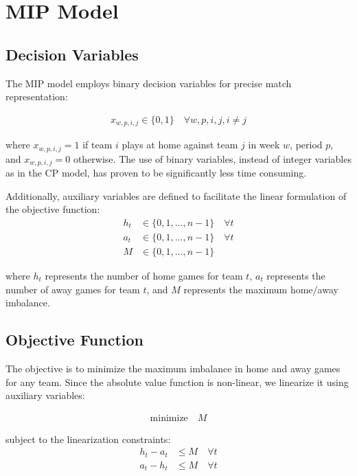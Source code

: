 \documentclass[11pt]{article}
\begin{document}
\section{MIP Model}

\subsection{Decision Variables}

The MIP model employs binary decision variables for precise match representation:

\begin{align}
x_{w,p,i,j} \in \{0,1\} \quad \forall w, p, i,j, i \neq j
\end{align}

where $x_{w,p,i,j} = 1$ if team $i$ plays at home against team $j$ in week $w$, period $p$, and $x_{w,p,i,j} = 0$ otherwise. The use of binary variables, instead of integer variables as in the CP model, has proven to be significantly less time consuming.

Additionally, auxiliary variables are defined to facilitate the linear formulation of the objective function:
\begin{align}
h_t &\in \{0, 1, \ldots, n-1\} \quad \forall t \\
a_t &\in \{0, 1, \ldots, n-1\} \quad \forall t \\
M &\in \{0, 1, \ldots, n-1\}
\end{align}

where $h_t$ represents the number of home games for team $t$, $a_t$ represents the number of away games for team $t$, and $M$ represents the maximum home/away imbalance.

\subsection{Objective Function}

The objective is to minimize the maximum imbalance in home and away games for any team. Since the absolute value function is non-linear, we linearize it using auxiliary variables:

\begin{align}
\text{minimize} \quad M
\end{align}

subject to the linearization constraints:
\begin{align}
h_t - a_t &\leq M \quad \forall t \\
a_t - h_t &\leq M \quad \forall t
\end{align}
\end{document}
